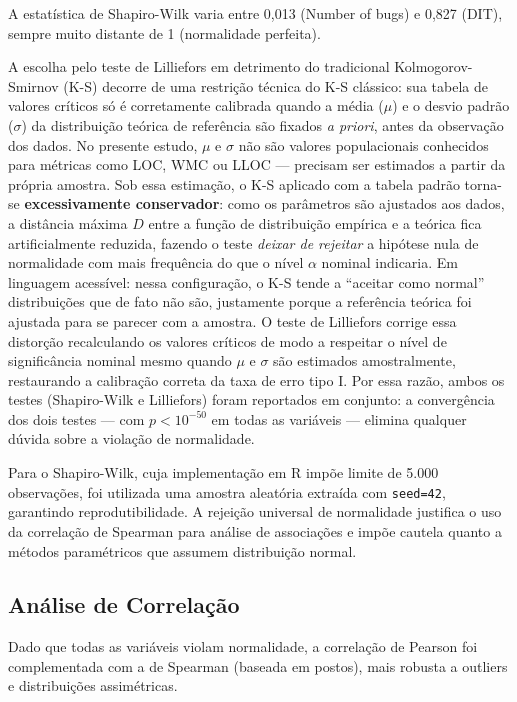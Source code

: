 \documentclass[12pt]{article}
\begin{document}
A estatística de Shapiro-Wilk varia entre 0,013 (Number of bugs) e 0,827 (DIT), sempre muito distante de 1 (normalidade perfeita).

A escolha pelo teste de Lilliefors \cite{lilliefors1967} em detrimento do tradicional Kolmogorov-Smirnov (K-S) decorre de uma restrição técnica do K-S clássico: sua tabela de valores críticos só é corretamente calibrada quando a média ($\mu$) e o desvio padrão ($\sigma$) da distribuição teórica de referência são fixados \textit{a priori}, antes da observação dos dados. No presente estudo, $\mu$ e $\sigma$ não são valores populacionais conhecidos para métricas como LOC, WMC ou LLOC --- precisam ser estimados a partir da própria amostra. Sob essa estimação, o K-S aplicado com a tabela padrão torna-se \textbf{excessivamente conservador}: como os parâmetros são ajustados aos dados, a distância máxima $D$ entre a função de distribuição empírica e a teórica fica artificialmente reduzida, fazendo o teste \emph{deixar de rejeitar} a hipótese nula de normalidade com mais frequência do que o nível $\alpha$ nominal indicaria. Em linguagem acessível: nessa configuração, o K-S tende a ``aceitar como normal'' distribuições que de fato não são, justamente porque a referência teórica foi ajustada para se parecer com a amostra. O teste de Lilliefors corrige essa distorção recalculando os valores críticos de modo a respeitar o nível de significância nominal mesmo quando $\mu$ e $\sigma$ são estimados amostralmente, restaurando a calibração correta da taxa de erro tipo I. Por essa razão, ambos os testes (Shapiro-Wilk e Lilliefors) foram reportados em conjunto: a convergência dos dois testes --- com $p < 10^{-50}$ em todas as variáveis --- elimina qualquer dúvida sobre a violação de normalidade.

Para o Shapiro-Wilk, cuja implementação em R impõe limite de 5.000 observações, foi utilizada uma amostra aleatória extraída com \texttt{seed=42}, garantindo reprodutibilidade. A rejeição universal de normalidade justifica o uso da correlação de Spearman para análise de associações e impõe cautela quanto a métodos paramétricos que assumem distribuição normal.

\subsection{Análise de Correlação}

Dado que todas as variáveis violam normalidade, a correlação de Pearson foi complementada com a de Spearman (baseada em postos), mais robusta a outliers e distribuições assimétricas.
\end{document}
